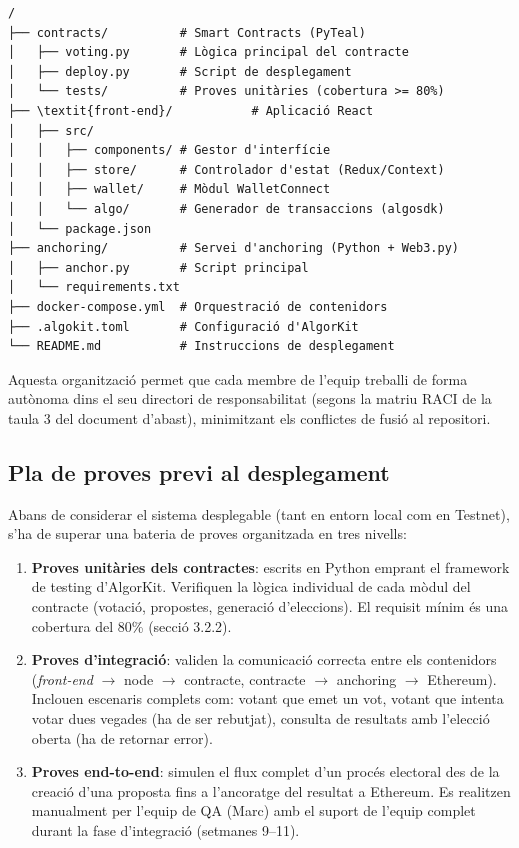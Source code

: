 \begin{verbatim}
/
├── contracts/          # Smart Contracts (PyTeal)
│   ├── voting.py       # Lògica principal del contracte
│   ├── deploy.py       # Script de desplegament
│   └── tests/          # Proves unitàries (cobertura >= 80%)
├── \textit{front-end}/           # Aplicació React
│   ├── src/
│   │   ├── components/ # Gestor d'interfície
│   │   ├── store/      # Controlador d'estat (Redux/Context)
│   │   ├── wallet/     # Mòdul WalletConnect
│   │   └── algo/       # Generador de transaccions (algosdk)
│   └── package.json
├── anchoring/          # Servei d'anchoring (Python + Web3.py)
│   ├── anchor.py       # Script principal
│   └── requirements.txt
├── docker-compose.yml  # Orquestració de contenidors
├── .algokit.toml       # Configuració d'AlgorKit
└── README.md           # Instruccions de desplegament
\end{verbatim}
 
Aquesta organització permet que cada membre de l'equip treballi de forma autònoma dins el seu directori de responsabilitat (segons la matriu RACI de la taula 3 del document d'abast), minimitzant els conflictes de fusió al repositori.
 
\subsection{Pla de proves previ al desplegament}
 
Abans de considerar el sistema desplegable (tant en entorn local com en Testnet), s'ha de superar una bateria de proves organitzada en tres nivells:
 
\begin{enumerate}[label=\roman*.]
    \item \textbf{Proves unitàries dels contractes}: escrits en Python emprant el framework de testing d'AlgorKit. Verifiquen la lògica individual de cada mòdul del contracte (votació, propostes, generació d'eleccions). El requisit mínim és una cobertura del 80\% (secció 3.2.2).
 
    \item \textbf{Proves d'integració}: validen la comunicació correcta entre els contenidors (\textit{front-end} $\rightarrow$ node $\rightarrow$ contracte, contracte $\rightarrow$ anchoring $\rightarrow$ Ethereum). Inclouen escenaris complets com: votant que emet un vot, votant que intenta votar dues vegades (ha de ser rebutjat), consulta de resultats amb l'elecció oberta (ha de retornar error).
 
    \item \textbf{Proves end-to-end}: simulen el flux complet d'un procés electoral des de la creació d'una proposta fins a l'ancoratge del resultat a Ethereum. Es realitzen manualment per l'equip de QA (Marc) amb el suport de l'equip complet durant la fase d'integració (setmanes 9--11).
\end{enumerate}
 
